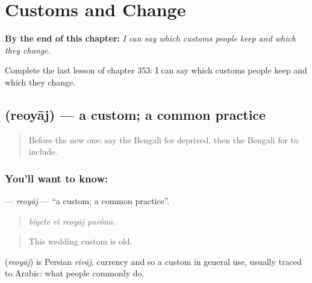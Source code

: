 
\chapter{Customs and Change}
\label{ch:bn-customs-and-change}

\begin{chapteropening}
\textbf{By the end of this chapter:} \emph{I can say which customs people keep and which they change.}

Complete the last lesson of chapter 353: I can say which customs people keep and which they change.
\end{chapteropening}

\section[\texorpdfstring{\bn{রেওয়াজ} (reoyāj)}{রেওয়াজ (reoyāj)}]{ (reoyāj) — a custom; a common practice}

\label{lesson:BN-C353-reoyaj}



\begin{quote}
Before the new one: say the Bengali for deprived, then the Bengali for to include.
\end{quote}

\subsection*{You'll want to know: }
\textbf{} — \emph{reoyāj} — \textquotedblleft{}a custom; a common practice\textquotedblright{}.

\begin{quote}
   
\end{quote}

\begin{quote}
\emph{biyete ei reoyāj purôno.}
\end{quote}

\begin{quote}
This wedding custom is old.
\end{quote}

\begin{cousinweb}
\textbf{} (\emph{reoyāj}) is Persian \emph{rivāj}, currency and so a custom in general use, usually traced to Arabic: what people commonly do.
\end{cousinweb}

